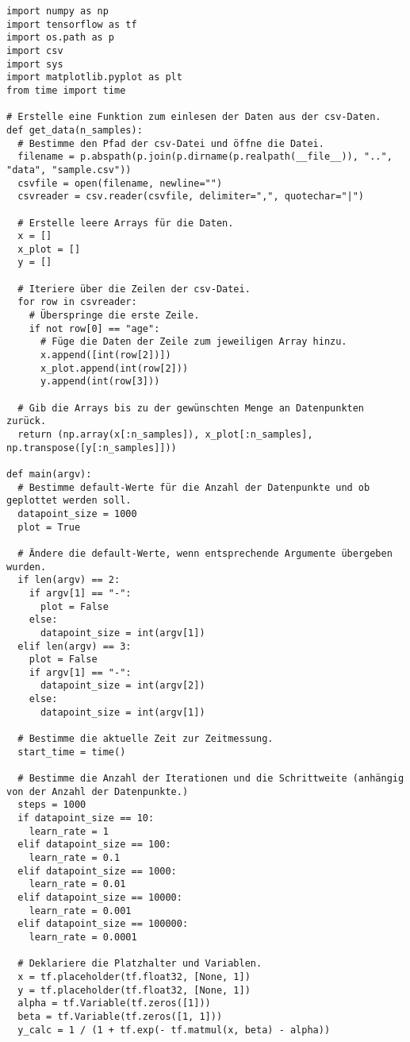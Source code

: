 \begin{verbatim}
import numpy as np
import tensorflow as tf
import os.path as p
import csv
import sys
import matplotlib.pyplot as plt
from time import time

# Erstelle eine Funktion zum einlesen der Daten aus der csv-Daten.
def get_data(n_samples):
  # Bestimme den Pfad der csv-Datei und öffne die Datei.
  filename = p.abspath(p.join(p.dirname(p.realpath(__file__)), "..", "data", "sample.csv"))
  csvfile = open(filename, newline="")
  csvreader = csv.reader(csvfile, delimiter=",", quotechar="|")

  # Erstelle leere Arrays für die Daten.
  x = []
  x_plot = []
  y = []

  # Iteriere über die Zeilen der csv-Datei.
  for row in csvreader:
    # Überspringe die erste Zeile.
    if not row[0] == "age":
      # Füge die Daten der Zeile zum jeweiligen Array hinzu.
      x.append([int(row[2])])
      x_plot.append(int(row[2]))
      y.append(int(row[3]))

  # Gib die Arrays bis zu der gewünschten Menge an Datenpunkten zurück.
  return (np.array(x[:n_samples]), x_plot[:n_samples], np.transpose([y[:n_samples]]))

def main(argv):
  # Bestimme default-Werte für die Anzahl der Datenpunkte und ob geplottet werden soll.
  datapoint_size = 1000
  plot = True

  # Ändere die default-Werte, wenn entsprechende Argumente übergeben wurden.
  if len(argv) == 2:
    if argv[1] == "-":
      plot = False
    else:
      datapoint_size = int(argv[1])
  elif len(argv) == 3:
    plot = False
    if argv[1] == "-":
      datapoint_size = int(argv[2])
    else:
      datapoint_size = int(argv[1])

  # Bestimme die aktuelle Zeit zur Zeitmessung.
  start_time = time()

  # Bestimme die Anzahl der Iterationen und die Schrittweite (anhängig von der Anzahl der Datenpunkte.)
  steps = 1000
  if datapoint_size == 10:
    learn_rate = 1
  elif datapoint_size == 100:
    learn_rate = 0.1
  elif datapoint_size == 1000:
    learn_rate = 0.01
  elif datapoint_size == 10000:
    learn_rate = 0.001
  elif datapoint_size == 100000:
    learn_rate = 0.0001

  # Deklariere die Platzhalter und Variablen.
  x = tf.placeholder(tf.float32, [None, 1])
  y = tf.placeholder(tf.float32, [None, 1])
  alpha = tf.Variable(tf.zeros([1]))
  beta = tf.Variable(tf.zeros([1, 1]))
  y_calc = 1 / (1 + tf.exp(- tf.matmul(x, beta) - alpha))


\end{verbatim}
